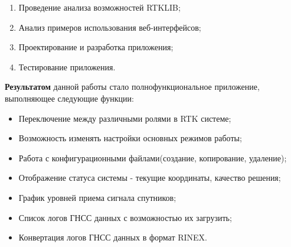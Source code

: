 \begin{enumerate}
  \item Проведение анализа возможностей RTKLIB;
  \item Анализ примеров использования веб-интерфейсов;
  \item Проектирование и разработка приложения;
  \item Тестирование приложения.
\end{enumerate}

\textbf{Результатом} данной работы стало полнофункциональное приложение, выполняющее следующие функции:

\begin{itemize}
  \item Переключение между различными ролями в RTK системе;
  \item Возможность изменять настройки основных режимов работы;
  \item Работа с конфигурационными файлами(создание, копирование, удаление);
  \item Отображение статуса системы - текущие координаты, качество решения;
  \item График уровней приема сигнала спутников;
  \item Список логов ГНСС данных с возможностью их загрузить;
  \item Конвертация логов ГНСС данных в формат RINEX.
\end{itemize}

